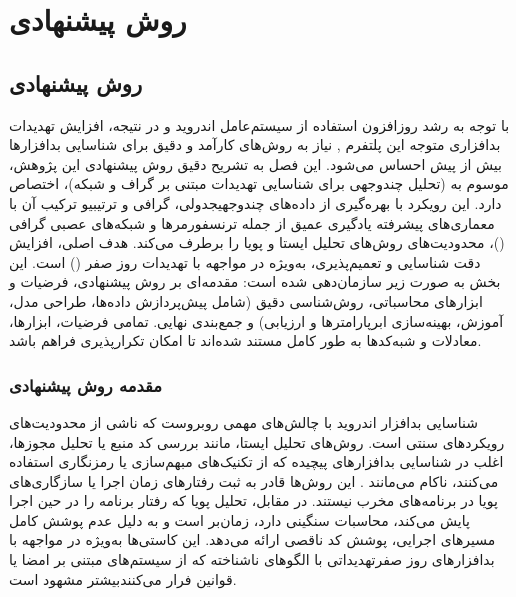 \clearpage
\thispagestyle{empty}
\chapter{روش پیشنهادی}\label{chap4}

\section{روش پیشنهادی}

با توجه به رشد روزافزون استفاده از سیستم‌عامل اندروید  و در نتیجه، افزایش تهدیدات بدافزاری متوجه این پلتفرم \cite{AndroidSecurity}, نیاز به روش‌های کارآمد و دقیق برای شناسایی بدافزارها بیش از پیش احساس می‌شود. این فصل به تشریح دقیق روش پیشنهادی این پژوهش، موسوم به \textbf{} (تحلیل چندوجهی برای شناسایی تهدیدات مبتنی بر گراف و شبکه)، اختصاص دارد. این رویکرد با بهره‌گیری از داده‌های چندوجهیجدولی، گرافی و ترتیبیو ترکیب آن با معماری‌های پیشرفته یادگیری عمیق از جمله ترنسفورمرها و شبکه‌های عصبی گرافی ()، محدودیت‌های روش‌های تحلیل ایستا و پویا را برطرف می‌کند. هدف اصلی، افزایش دقت شناسایی و تعمیم‌پذیری، به‌ویژه در مواجهه با تهدیدات روز صفر () است. این بخش به صورت زیر سازمان‌دهی شده است: مقدمه‌ای بر روش پیشنهادی، فرضیات و ابزارهای محاسباتی، روش‌شناسی دقیق (شامل پیش‌پردازش داده‌ها، طراحی مدل، آموزش، بهینه‌سازی ابرپارامترها و ارزیابی) و جمع‌بندی نهایی. تمامی فرضیات، ابزارها، معادلات و شبه‌کدها به طور کامل مستند شده‌اند تا امکان تکرارپذیری فراهم باشد.

\subsection{مقدمه روش پیشنهادی}

شناسایی بدافزار اندروید با چالش‌های مهمی روبروست که ناشی از محدودیت‌های رویکردهای سنتی است. روش‌های تحلیل ایستا، مانند بررسی کد منبع یا تحلیل مجوزها، اغلب در شناسایی بدافزارهای پیچیده که از تکنیک‌های مبهم‌سازی یا رمزنگاری استفاده می‌کنند، ناکام می‌مانند \cite{Drebin}. این روش‌ها قادر به ثبت رفتارهای زمان اجرا یا سازگاری‌های پویا در برنامه‌های مخرب نیستند. در مقابل، تحلیل پویا که رفتار برنامه را در حین اجرا پایش می‌کند، محاسبات سنگینی دارد، زمان‌بر است و به دلیل عدم پوشش کامل مسیرهای اجرایی، پوشش کد ناقصی ارائه می‌دهد. این کاستی‌ها به‌ویژه در مواجهه با بدافزارهای روز صفرتهدیداتی با الگوهای ناشناخته که از سیستم‌های مبتنی بر امضا یا قوانین فرار می‌کنندبیشتر مشهود است.

